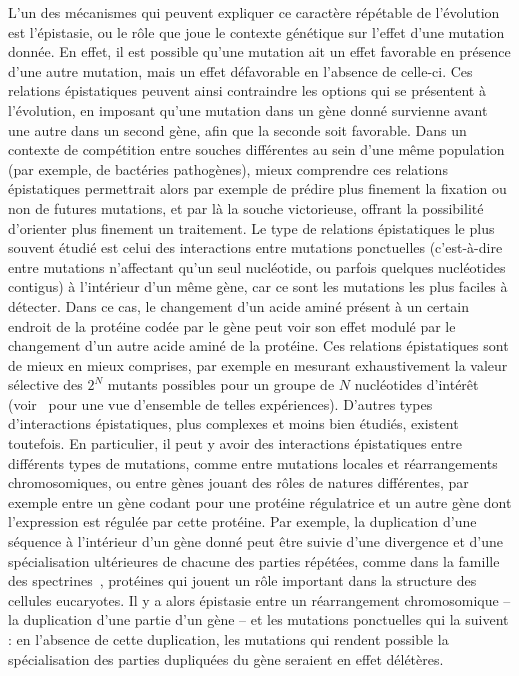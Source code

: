 L'un des mécanismes qui peuvent expliquer ce caractère répétable de l'évolution est l'épistasie, ou le rôle que joue le contexte génétique sur l'effet d'une mutation donnée.
En effet, il est possible qu'une mutation ait un effet favorable en présence d'une autre mutation, mais un effet défavorable en l'absence de celle-ci.
Ces relations épistatiques peuvent ainsi contraindre les options qui se présentent à l'évolution, en imposant qu'une mutation dans un gène donné survienne avant une autre dans un second gène, afin que la seconde soit favorable.
Dans un contexte de compétition entre souches différentes au sein d'une même population (par exemple, de bactéries pathogènes), mieux comprendre ces relations épistatiques permettrait alors par exemple de prédire plus finement la fixation ou non de futures mutations, et par là la souche victorieuse, offrant la possibilité d'orienter plus finement un traitement.
Le type de relations épistatiques le plus souvent étudié est celui des interactions entre mutations ponctuelles (c'est-à-dire entre mutations n'affectant qu'un seul nucléotide, ou parfois quelques nucléotides contigus) à l'intérieur d'un même gène, car ce sont les mutations les plus faciles à détecter.
Dans ce cas, le changement d'un acide aminé présent à un certain endroit de la protéine codée par le gène peut voir son effet modulé par le changement d'un autre acide aminé de la protéine.
Ces relations épistatiques sont de mieux en mieux comprises, par exemple en mesurant exhaustivement la valeur sélective des $2^N$ mutants possibles pour un groupe de $N$ nucléotides d'intérêt (voir~\cite{achaz2014} pour une vue d'ensemble de telles expériences).
D'autres types d'interactions épistatiques, plus complexes et moins bien étudiés, existent toutefois.
En particulier, il peut y avoir des interactions épistatiques entre différents types de mutations, comme entre mutations locales et réarrangements chromosomiques, ou entre gènes jouant des rôles de natures différentes, par exemple entre un gène codant pour une protéine régulatrice et un autre gène dont l'expression est régulée par cette protéine.
Par exemple, la duplication d'une séquence à l'intérieur d'un gène donné peut être suivie d'une divergence et d'une spécialisation ultérieures de chacune des parties répétées, comme dans la famille des spectrines~\citep{thomas1997}, protéines qui jouent un rôle important dans la structure des cellules eucaryotes.
Il y a alors épistasie entre un réarrangement chromosomique -- la duplication d'une partie d'un gène -- et les mutations ponctuelles qui la suivent : en l'absence de cette duplication, les mutations qui rendent possible la spécialisation des parties dupliquées du gène seraient en effet délétères.

